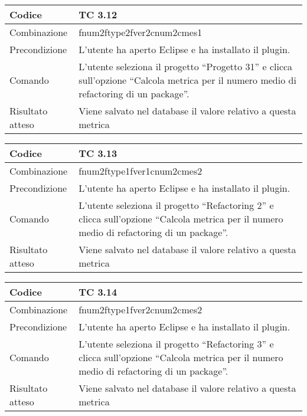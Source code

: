 \begin{table}[ht]
\begin{tabular}{|p{3cm}|p{9cm}|}
\hline
\cellcolor{lightgray}Codice				& TC 3.12								\\
\hline
\cellcolor{lightgray}Combinazione		& fnum2ftype2fver2cnum2cmes1 									\\
\hline
\cellcolor{lightgray}Precondizione		& L'utente ha aperto Eclipse e ha installato il plugin.				\\
\hline 
\cellcolor{lightgray}Comando 			& L'utente seleziona il progetto ``Progetto 31''  e clicca sull'opzione ``Calcola metrica per il numero medio di refactoring di un package''.	\\
\hline
\cellcolor{lightgray}Risultato atteso	& Viene salvato nel database il valore relativo a questa metrica	\\
\hline
\end{tabular}
\end{table}

\begin{table}[ht]
\begin{tabular}{|p{3cm}|p{9cm}|}
\hline
\cellcolor{lightgray}Codice				& TC 3.13								\\
\hline
\cellcolor{lightgray}Combinazione		& fnum2ftype1fver1cnum2cmes2 									\\
\hline
\cellcolor{lightgray}Precondizione		& L'utente ha aperto Eclipse e ha installato il plugin.					\\
\hline
\cellcolor{lightgray}Comando			& L'utente seleziona il progetto ``Refactoring 2''  e clicca sull'opzione ``Calcola metrica per il numero medio di refactoring di un package''.	\\
\hline
\cellcolor{lightgray}Risultato atteso	& Viene salvato nel database il valore relativo a questa metrica	\\
\hline
\end{tabular}
\end{table}

\begin{table}[ht]
\begin{tabular}{|p{3cm}|p{9cm}|}
\hline
\cellcolor{lightgray}Codice				& TC 3.14								\\
\hline
\cellcolor{lightgray}Combinazione		& fnum2ftype1fver2cnum2cmes2									\\
\hline
\cellcolor{lightgray}Precondizione		& L'utente ha aperto Eclipse e ha installato il plugin.			\\
\hline
\cellcolor{lightgray}Comando			& L'utente seleziona il progetto ``Refactoring 3''  e clicca sull'opzione ``Calcola metrica per il numero medio di refactoring di un package''.	\\
\hline
\cellcolor{lightgray}Risultato atteso	& Viene salvato nel database il valore relativo a questa metrica	\\
\hline
\end{tabular}
\end{table}

